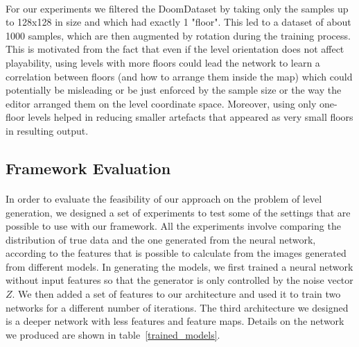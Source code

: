 \paragraph{} For our experiments we filtered the DoomDataset by taking only the samples up to 128x128 in size and which had exactly 1 "floor". This led to a dataset of about 1000 samples, which are then augmented by rotation during the training process. This is motivated from the fact that even if the level orientation does not affect playability, using levels with more floors could lead the network to learn a correlation between floors (and how to arrange them inside the map) which could potentially be misleading or be just enforced by the sample size or the way the editor arranged them on the level coordinate space. Moreover, using only one-floor levels helped in reducing smaller artefacts that appeared as very small floors in resulting output.



\subsection{Framework Evaluation}
\label{sec:modelevaluation}
\paragraph{} In order to evaluate the feasibility of our approach on the problem of level generation, we designed a set of experiments to test some of the settings that are possible to use with our framework. 
All the experiments involve comparing the distribution of true data and the one generated from the neural network, according to the features that is possible to calculate from the images generated from different models. In generating the models, we first trained a neural network without input features so that the generator is only controlled by the noise vector $Z$. We then added a set of features to our architecture and used it to train two networks for a different number of iterations. The third architecture we designed is a deeper network with less features and feature maps. Details on the network we produced are shown in table~\ref{trained_models}.


